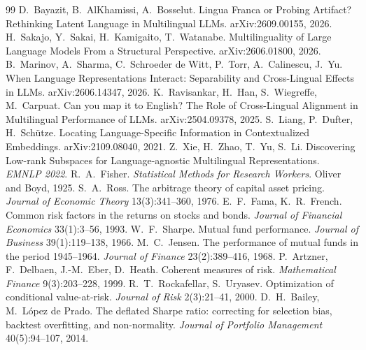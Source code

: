 \documentclass[11pt,a4paper]{article}
\begin{document}
\begin{thebibliography}{99}
D.~Bayazit, B.~AlKhamissi, A.~Bosselut. Lingua Franca or Probing Artifact?
Rethinking Latent Language in Multilingual LLMs. arXiv:2609.00155, 2026.
H.~Sakajo, Y.~Sakai, H.~Kamigaito, T.~Watanabe. Multilinguality of Large
Language Models From a Structural Perspective. arXiv:2606.01800, 2026.
B.~Marinov, A.~Sharma, C.~Schroeder de Witt, P.~Torr, A.~Calinescu, J.~Yu.
When Language Representations Interact: Separability and Cross-Lingual
Effects in LLMs. arXiv:2606.14347, 2026.
K.~Ravisankar, H.~Han, S.~Wiegreffe, M.~Carpuat. Can you map it to English?
The Role of Cross-Lingual Alignment in Multilingual Performance of LLMs.
arXiv:2504.09378, 2025.
S.~Liang, P.~Dufter, H.~Sch\"utze. Locating Language-Specific Information in
Contextualized Embeddings. arXiv:2109.08040, 2021.
Z.~Xie, H.~Zhao, T.~Yu, S.~Li. Discovering Low-rank Subspaces for
Language-agnostic Multilingual Representations. \emph{EMNLP 2022}.
R.~A.~Fisher. \emph{Statistical Methods for Research Workers}. Oliver and
Boyd, 1925.
S.~A.~Ross. The arbitrage theory of capital asset pricing. \emph{Journal of
Economic Theory} 13(3):341--360, 1976.
E.~F.~Fama, K.~R.~French. Common risk factors in the returns on stocks and
bonds. \emph{Journal of Financial Economics} 33(1):3--56, 1993.
W.~F.~Sharpe. Mutual fund performance. \emph{Journal of Business}
39(1):119--138, 1966.
M.~C.~Jensen. The performance of mutual funds in the period 1945--1964.
\emph{Journal of Finance} 23(2):389--416, 1968.
P.~Artzner, F.~Delbaen, J.-M.~Eber, D.~Heath. Coherent measures of risk.
\emph{Mathematical Finance} 9(3):203--228, 1999.
R.~T.~Rockafellar, S.~Uryasev. Optimization of conditional value-at-risk.
\emph{Journal of Risk} 2(3):21--41, 2000.
D.~H.~Bailey, M.~L\'opez de Prado. The deflated Sharpe ratio: correcting for
selection bias, backtest overfitting, and non-normality. \emph{Journal of
Portfolio Management} 40(5):94--107, 2014.

\end{thebibliography}
\end{document}
